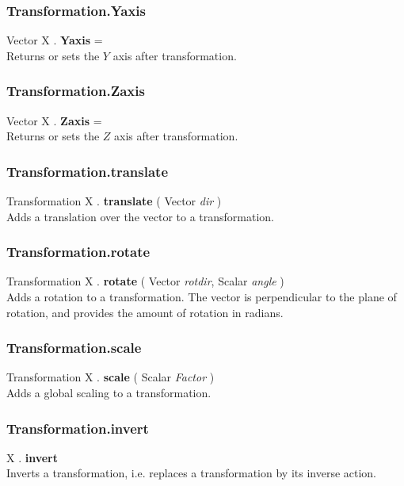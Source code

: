 \subsubsection{Transformation.Yaxis \label{F:Transformation:Yaxis}}
Vector X . \textbf{Yaxis} = \\
Returns or sets the $Y$ axis after transformation.


\subsubsection{Transformation.Zaxis \label{F:Transformation:Zaxis}}
Vector X . \textbf{Zaxis} = \\
Returns or sets the $Z$ axis after transformation.


\subsubsection{Transformation.translate \label{F:Transformation:translate}}
Transformation X . \textbf{translate} ( Vector \textit{dir} ) \\
Adds a translation over the vector  to a transformation.

\subsubsection{Transformation.rotate \label{F:Transformation:rotate}}
Transformation X . \textbf{rotate} ( Vector \textit{rotdir}, Scalar \textit{angle} ) \\
Adds a rotation to a transformation. The vector  is perpendicular to the plane of rotation, and  provides the amount of rotation in radians.

\subsubsection{Transformation.scale \label{F:Transformation:scale}}
Transformation X . \textbf{scale} ( Scalar \textit{Factor} ) \\
Adds a global scaling to a transformation.

\subsubsection{Transformation.invert \label{F:Transformation:invert}}
X . \textbf{invert} \\
Inverts a transformation, i.e. replaces a transformation by its inverse action.

